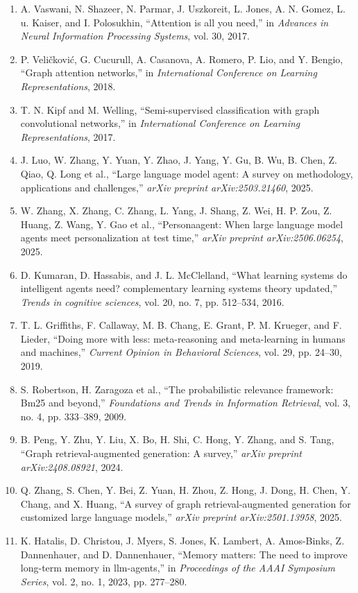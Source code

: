 \documentclass[10pt,UTF8,fontset=fandol]{ctexart}
\begin{document}
\begin{enumerate}[leftmargin=2.4em,labelsep=0.4em,itemsep=0.15em]
\item A. Vaswani, N. Shazeer, N. Parmar, J. Uszkoreit, L. Jones, A. N. Gomez, L. u. Kaiser, and I. Polosukhin, ``Attention is all you need,'' in \textit{Advances in Neural Information Processing Systems}, vol. 30, 2017.
\item P. Veličković, G. Cucurull, A. Casanova, A. Romero, P. Lio, and Y. Bengio, ``Graph attention networks,'' in \textit{International Conference on Learning Representations}, 2018.
\item T. N. Kipf and M. Welling, ``Semi-supervised classification with graph convolutional networks,'' in \textit{International Conference on Learning Representations}, 2017.
\item J. Luo, W. Zhang, Y. Yuan, Y. Zhao, J. Yang, Y. Gu, B. Wu, B. Chen, Z. Qiao, Q. Long et al., ``Large language model agent: A survey on methodology, applications and challenges,'' \textit{arXiv preprint arXiv:2503.21460}, 2025.
\item W. Zhang, X. Zhang, C. Zhang, L. Yang, J. Shang, Z. Wei, H. P. Zou, Z. Huang, Z. Wang, Y. Gao et al., ``Personaagent: When large language model agents meet personalization at test time,'' \textit{arXiv preprint arXiv:2506.06254}, 2025.
\item D. Kumaran, D. Hassabis, and J. L. McClelland, ``What learning systems do intelligent agents need? complementary learning systems theory updated,'' \textit{Trends in cognitive sciences}, vol. 20, no. 7, pp. 512--534, 2016.
\item T. L. Griffiths, F. Callaway, M. B. Chang, E. Grant, P. M. Krueger, and F. Lieder, ``Doing more with less: meta-reasoning and meta-learning in humans and machines,'' \textit{Current Opinion in Behavioral Sciences}, vol. 29, pp. 24--30, 2019.
\item S. Robertson, H. Zaragoza et al., ``The probabilistic relevance framework: Bm25 and beyond,'' \textit{Foundations and Trends in Information Retrieval}, vol. 3, no. 4, pp. 333--389, 2009.
\item B. Peng, Y. Zhu, Y. Liu, X. Bo, H. Shi, C. Hong, Y. Zhang, and S. Tang, ``Graph retrieval-augmented generation: A survey,'' \textit{arXiv preprint arXiv:2408.08921}, 2024.
\item Q. Zhang, S. Chen, Y. Bei, Z. Yuan, H. Zhou, Z. Hong, J. Dong, H. Chen, Y. Chang, and X. Huang, ``A survey of graph retrieval-augmented generation for customized large language models,'' \textit{arXiv preprint arXiv:2501.13958}, 2025.
\item K. Hatalis, D. Christou, J. Myers, S. Jones, K. Lambert, A. Amos-Binks, Z. Dannenhauer, and D. Dannenhauer, ``Memory matters: The need to improve long-term memory in llm-agents,'' in \textit{Proceedings of the AAAI Symposium Series}, vol. 2, no. 1, 2023, pp. 277--280.

\end{enumerate}
\end{document}
